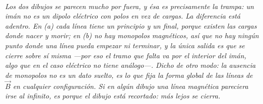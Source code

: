 \begin{center}
\begin{tikzpicture}[scale=1]
\end{tikzpicture}\\[0.5em]
{\small\itshape Los dos dibujos se parecen mucho por fuera, y ésa es
precisamente la trampa: un imán no es un dipolo eléctrico con polos en vez de
cargas. La diferencia está adentro. En (a) cada línea tiene un principio y un
final, porque existen las cargas donde nacer y morir; en (b) no hay monopolos
magnéticos, así que no hay ningún punto donde una línea pueda empezar ni
terminar, y la única salida es que se cierre sobre sí misma ---por eso el tramo
que falta va por el interior del imán, algo que en el caso eléctrico no tiene
análogo---. Dicho de otro modo: la ausencia de monopolos no es un dato suelto,
es lo que fija la forma global de las líneas de $\vec B$ en cualquier
configuración. Si en algún dibujo una línea magnética pareciera irse al
infinito, es porque el dibujo está recortado: más lejos se cierra.}
\end{center}
